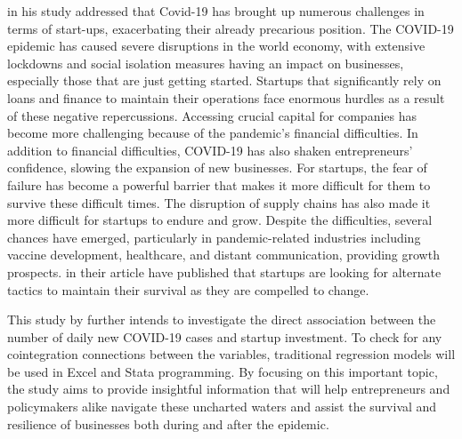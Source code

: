 \documentclass[12pt]{article}
\begin{document}
\cite{zhimeng2021assessing} in his study addressed that Covid-19 has brought up numerous challenges in terms of start-ups, exacerbating their already precarious position. The COVID-19 epidemic has caused severe disruptions in the world economy, with extensive lockdowns and social isolation measures having an impact on businesses, especially those that are just getting started. Startups that significantly rely on loans and finance to maintain their operations face enormous hurdles as a result of these negative repercussions. Accessing crucial capital for companies has become more challenging because of the pandemic's financial difficulties. In addition to financial difficulties, COVID-19 has also shaken entrepreneurs' confidence, slowing the expansion of new businesses. For startups, the fear of failure has become a powerful barrier that makes it more difficult for them to survive these difficult times. The disruption of supply chains has also made it more difficult for startups to endure and grow. Despite the difficulties, several chances have emerged, particularly in pandemic-related industries including vaccine development, healthcare, and distant communication, providing growth prospects. \citep{wagh2022study} in their article have published that startups are looking for alternate tactics to maintain their survival as they are compelled to change.

This study by \citep{wagh2022study} further intends to investigate the direct association between the number of daily new COVID-19 cases and startup investment. To check for any cointegration connections between the variables, traditional regression models will be used in Excel and Stata programming. By focusing on this important topic, the study aims to provide insightful information that will help entrepreneurs and policymakers alike navigate these uncharted waters and assist the survival and resilience of businesses both during and after the epidemic.
\end{document}
